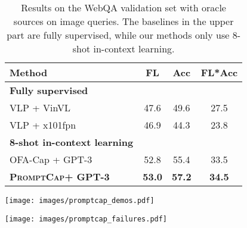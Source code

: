 \documentclass[10pt,twocolumn,letterpaper]{article}
\newcommand{\NAME}{\textsc{PromptCap}\xspace}
\begin{document}
\begin{table}[h]
\small
\centering
\caption{
Results on the WebQA validation set with oracle sources on image queries.
The baselines in the upper part are fully supervised, while our methods only use 8-shot in-context learning.
}
\begin{tabular}{l|ccc}
\toprule[1.2pt]
Method & FL & Acc & FL*Acc \\
\midrule
\textbf{Fully supervised} \\
VLP + VinVL~\cite{chang2022webqa} & 47.6 & 49.6 & 27.5 \\
VLP + x101fpn~\cite{chang2022webqa} & 46.9 & 44.3 & 23.8 \\
\midrule
\textbf{8-shot in-context learning}\\
OFA-Cap + GPT-3 & 52.8 & 55.4 & 33.5\\
\textbf{\NAME + GPT-3} & \textbf{53.0} & \textbf{57.2} & \textbf{34.5}\\ 
\bottomrule[1.2pt]
\end{tabular}
\label{tab:webqa}
\vspace{-5mm}
\end{table} 
\begin{figure*}[h]
\centering
  \texttt{[image: images/promptcap\_demos.pdf]}
  
  \caption{Example captions generated by \NAME and OFA-Cap, and the answers GPT-3 generated the captions. For all these questions, GPT-3 yields the correct answer given \NAME captions but fails given the generic caption. Questions are from OK-VQA.
 }

  \label{fig:ok_vqa_demo}
\end{figure*}


\begin{figure*}[h]
\centering
  \texttt{[image: images/promptcap\_failures.pdf]}
  
  \caption{Representative failure cases of \NAME and GPT-3 pipeline on OK-VQA.
 }
\vspace{-4mm}
  \label{fig:failures_demo}
\end{figure*}
\end{document}
